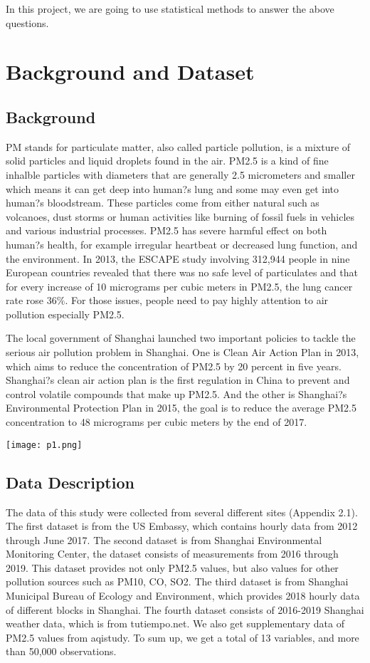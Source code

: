\documentclass[11pt,]{article}
\begin{document}
In this project, we are going to use statistical methods to answer the above questions.

\section{Background and Dataset}

\subsection{Background}

PM stands for particulate matter, also called particle pollution, is a mixture of solid particles and liquid droplets found in the air. PM2.5 is a kind of fine inhalble particles with diameters that are generally 2.5 micrometers and smaller which means it can get deep into human?s lung and some may even get into human?s bloodstream. These particles come from either natural such as volcanoes, dust storms or human activities like burning of fossil fuels in vehicles and various industrial processes. PM2.5 has severe harmful effect on both human?s health, for example irregular heartbeat or decreased lung function, and the environment. In 2013, the ESCAPE study involving 312,944 people in nine European countries revealed that there was no safe level of particulates and that for every increase of 10 micrograms per cubic meters in PM2.5, the lung cancer rate rose $36\%$. For those issues, people need to pay highly attention to air pollution especially PM2.5.

The local government of Shanghai launched two important policies to tackle the serious air pollution problem in Shanghai. One is Clean Air Action Plan in 2013, which aims to reduce the concentration of PM2.5 by 20 percent in five years. Shanghai?s clean air action plan is the first regulation in China to prevent and control volatile compounds that make up PM2.5. And the other is Shanghai?s Environmental Protection Plan in 2015, the goal is to reduce the average PM2.5 concentration to 48 micrograms per cubic meters by the end of 2017.

{\texttt{[image: p1.png]}}

\subsection{Data Description}

The data of this study were collected from several different sites (Appendix 2.1). The first dataset is from the US Embassy, which contains hourly data from 2012 through June 2017. The second dataset is from Shanghai Environmental Monitoring Center, the dataset consists of measurements from 2016 through 2019. This dataset provides not only PM2.5 values, but also values for other pollution sources such as PM10, CO, SO2. The third dataset is from Shanghai Municipal Bureau of Ecology and Environment, which provides 2018 hourly data of different blocks in Shanghai. The fourth dataset consists of 2016-2019 Shanghai weather data, which is from tutiempo.net. We also get supplementary data of PM2.5 values from aqistudy. To sum up, we get a total of 13 variables, and more than 50,000 observations. 
\end{document}
